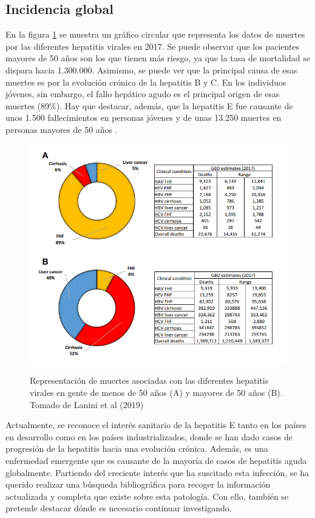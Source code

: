 \documentclass[11 pt]{article}
\begin{document}
\subsection{Incidencia global}
En la figura \ref{laninigrafico} se muestra un gráfico circular que representa los datos de muertes por las diferentes hepatitis virales en 2017. Se puede observar que los pacientes mayores de 50 años son los que tienen más riesgo, ya que la tasa de mortalidad se dispara hacia 1.300.000. Asimismo, se puede ver que la principal causa de esas muertes es por la evolución crónica de la hepatitis B y C. En los individuos jóvenes, sin embargo, el fallo hepático agudo es el principal origen de esas muertes (89\%). Hay que destacar, además, que la hepatitis E fue causante de unos 1.500 fallecimientos en personas jóvenes y de unas 13.250 muertes en personas mayores de 50 años \cite{Lanini2019}.
\begin{figure} [h!] 
	\centering
	\includegraphics[width=0.75\linewidth]{imagenes/graficoincidenciahepatitis.png}
	{\scriptsize \itshape \caption[loftitle]{Representación de muertes asociadas con las diferentes hepatitis virales en gente de menos de 50 años (A) y mayores de 50 años (B). Tomado de Lanini et al (2019) \cite{Lanini2019}}}
	\label{laninigrafico}
\end{figure}

Actualmente, se reconoce el interés sanitario de la hepatitis E tanto en los países en desarrollo como en los países industrializados, donde se han dado casos de progresión de la hepatitis hacia una evolución crónica. Además, es una enfermedad emergente que es causante de la mayoría de casos de hepatitis aguda globalmente. Partiendo del creciente interés que ha suscitado esta infección, se ha querido realizar una búsqueda bibliográfica para recoger la información actualizada y completa que existe sobre esta patología. Con ello, también se pretende destacar dónde es necesario continuar investigando.
\end{document}
